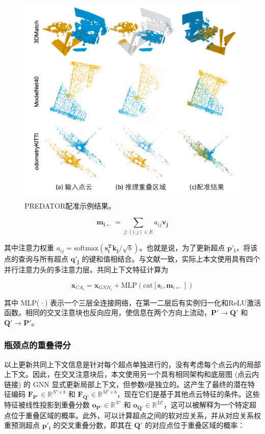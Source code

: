\begin{figure}
    \vspace{-5mm}
    \centering
    \includegraphics[width=0.6\linewidth]{images/PREDATOR_results.pdf}
    \caption{
        PREDATOR配准示例结果。}
    \label{fig:predator_results}
    \vspace{-5mm}
\end{figure}

\begin{equation}
\boldsymbol{m_{i \leftarrow}} = \sum_{j:(i,j)\in E} a_{ij}\boldsymbol{v_j}
\end{equation}

其中注意力权重 $a_{ij} = \text{softmax}(\boldsymbol{s_i^T k_j}/\sqrt{b})$。也就是说，为了更新超点 $\boldsymbol{p'_i}$，将该点的查询与所有超点 $\boldsymbol{q'_j}$ 的键和值相结合。与文献一致，实际上本文使用具有四个并行注意力头的多注意力层。共同上下文特征计算为

\begin{equation}
\boldsymbol{x}_{CA_i} = \boldsymbol{x}_{GNN_i} + \text{MLP}(\text{cat}[\boldsymbol{s}_i, \boldsymbol{m}_{i \leftarrow}])
\end{equation}

其中 MLP(·) 表示一个三层全连接网络，在第一二层后有实例归一化和ReLU激活函数。相同的交叉注意块也反向应用，使信息在两个方向上流动，$\boldsymbol{P'} \rightarrow \boldsymbol{Q'}$ 和 $\boldsymbol{Q'} \rightarrow \boldsymbol{P'}$。

\subsubsection{瓶颈点的重叠得分}
以上更新共同上下文信息是针对每个超点单独进行的，没有考虑每个点云内的局部上下文。因此，在交叉注意块后，本文使用另一个具有相同架构和底层图 (点云内链接) 的 GNN 显式更新局部上下文，但参数$\theta$是独立的。这产生了最终的潜在特征编码 $\boldsymbol{F_{P'}} \in \mathbb{R}^{N' \times b}$ 和 $\boldsymbol{F_{Q'}} \in \mathbb{R}^{M' \times b}$，现在它们是基于其他点云特征的条件。这些特征被线性投影到重叠分数 $\boldsymbol{o_{P'}} \in \mathbb{R}^{N'}$ 和 $\boldsymbol{o_{Q'}} \in \mathbb{R}^{M'}$，这可以被解释为一个特定超点位于重叠区域的概率。此外，可以计算超点之间的软对应关系，并从对应关系权重预测超点 $\boldsymbol{p'_i}$ 的交叉重叠分数，即其在 $\boldsymbol{Q'}$ 的对应点位于重叠区域的概率：

